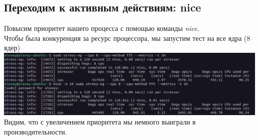 \documentclass[12pt,onecolumn]{article}
\begin{document}
\subsection{Переходим к активным действиям: nice}
Повысим приоритет нашего процесса с помощью команды \textit{nice}.\\
Чтобы была конкуренция за ресурс процессора, мы запустим тест на все ядра (8 ядер)\\
\includegraphics[width=\textwidth]{image/nice.png}
Видим, что с увеличением приоритета мы немного выиграли в производительности.
\end{document}
